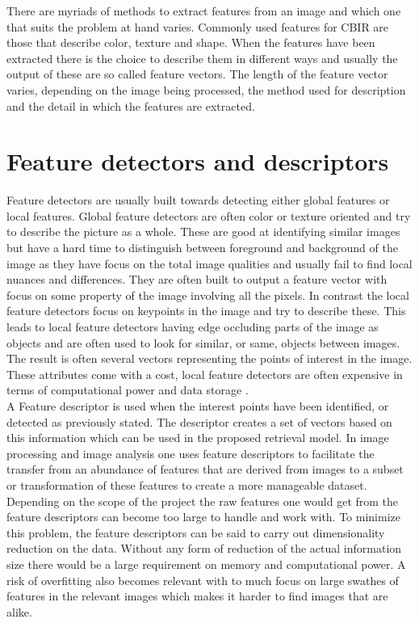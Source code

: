There are myriads of methods to extract features from an image and which one that suits the problem at hand varies. Commonly used features for CBIR are those that describe color, texture and shape. When the features have been extracted there is the choice to describe them in different ways and usually the output of these are so called feature vectors. The length of the feature vector varies, depending on the image being processed, the method used for description and the detail in which the features are extracted. 

\section{Feature detectors and descriptors}
\label{sec:feature_descriptors}
Feature detectors are usually built towards detecting either global features or local features. Global feature detectors are often color or texture oriented and try to describe the picture as a whole. These are good at identifying similar images but have a hard time to distinguish between foreground and background of the image as they have focus on the total image qualities and usually fail to find local nuances and differences. They are often built to output a feature vector with focus on some property of the image involving all the pixels. In contrast the local feature detectors focus on keypoints in the image and try to describe these. This leads to local feature detectors having edge occluding parts of the image as objects and are often used to look for similar, or same, objects between images. The result is often several vectors representing the points of interest in the image. These attributes come with a cost, local feature detectors are often expensive in terms of computational power and data storage \cite{hassaballah2016image}. \\

A Feature descriptor is used when the interest points have been identified, or detected as previously stated. The descriptor creates a set of vectors based on this information which can be used in the proposed retrieval model. In image processing and image analysis one uses feature descriptors to facilitate the transfer from an abundance of features that are derived from images to a subset or transformation of these features to create a more manageable dataset. Depending on the scope of the project the raw features one would get from the feature descriptors can become too large to handle and work with. To minimize this problem, the feature descriptors can be said to carry out dimensionality reduction on the data. Without any form of reduction of the actual information size there would be a large requirement on memory and computational power. A risk of overfitting also becomes relevant with to much focus on large swathes of features in the relevant images which makes it harder to find images that are alike. \\

